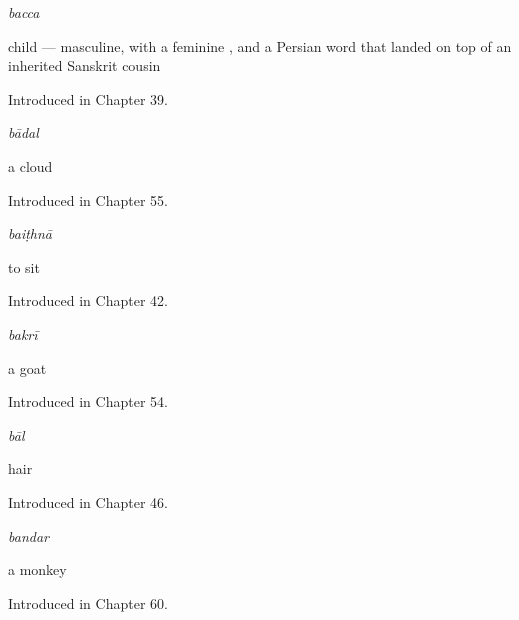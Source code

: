 \noindent\begin{minipage}[t]{\linewidth}
\raggedright
\textbf{}\enspace\emph{bacca}\par
\small child — masculine, with a feminine , and a Persian word that landed on top of an inherited Sanskrit cousin\par
\footnotesize Introduced in Chapter 39.
\end{minipage}\par\medskip

\noindent\begin{minipage}[t]{\linewidth}
\raggedright
\textbf{}\enspace\emph{bādal}\par
\small a cloud\par
\footnotesize Introduced in Chapter 55.
\end{minipage}\par\medskip

\noindent\begin{minipage}[t]{\linewidth}
\raggedright
\textbf{}\enspace\emph{baiṭhnā}\par
\small to sit\par
\footnotesize Introduced in Chapter 42.
\end{minipage}\par\medskip

\noindent\begin{minipage}[t]{\linewidth}
\raggedright
\textbf{}\enspace\emph{bakrī}\par
\small a goat\par
\footnotesize Introduced in Chapter 54.
\end{minipage}\par\medskip

\noindent\begin{minipage}[t]{\linewidth}
\raggedright
\textbf{}\enspace\emph{bāl}\par
\small hair\par
\footnotesize Introduced in Chapter 46.
\end{minipage}\par\medskip

\noindent\begin{minipage}[t]{\linewidth}
\raggedright
\textbf{}\enspace\emph{bandar}\par
\small a monkey\par
\footnotesize Introduced in Chapter 60.
\end{minipage}\par\medskip

